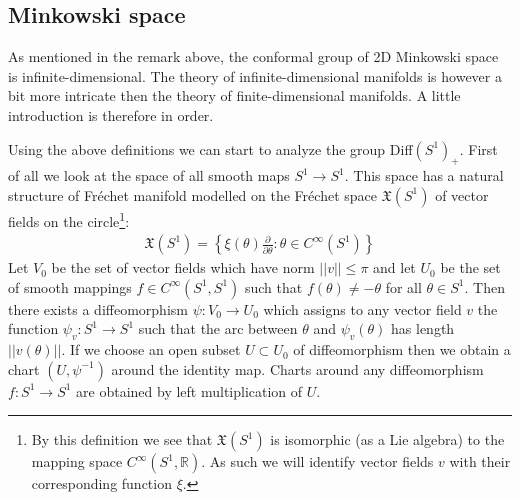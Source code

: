 \subsection{Minkowski space}

	As mentioned in the remark above, the conformal group of 2D Minkowski space is infinite-dimensional. The theory of infinite-dimensional manifolds is however a bit more intricate then the theory of finite-dimensional manifolds. A little introduction is therefore in order.

	
	Using the above definitions we can start to analyze the group Diff$(S^1)_+$. First of all we look at the space of all smooth maps $S^1\rightarrow S^1$. This space has a natural structure of Fr\'echet manifold modelled on the Fr\'echet space $\mathfrak{X}(S^1)$ of vector fields on the circle\footnote{By this definition we see that $\mathfrak{X}(S^1)$ is isomorphic (as a Lie algebra) to the mapping space $C^\infty(S^1, \mathbb{R})$. As such we will identify vector fields $v$ with their corresponding function $\xi$.}:
	\begin{gather}
		\mathfrak{X}(S^1) = \left\{\xi(\theta)\frac{\partial}{\partial\theta}:\theta\in C^\infty(S^1)\right\}
	\end{gather}
	Let $V_0$ be the set of vector fields which have norm $||v||\leq\pi$ and let $U_0$ be the set of smooth mappings $f\in C^\infty(S^1, S^1)$ such that $f(\theta)\neq-\theta$ for all $\theta\in S^1$. Then there exists a diffeomorphism $\psi:V_0\rightarrow U_0$ which assigns to any vector field $v$ the function $\psi_v:S^1\rightarrow S^1$ such that the arc between $\theta$ and $\psi_v(\theta)$ has length $||v(\theta)||$. If we choose an open subset $U\subset U_0$ of diffeomorphism then we obtain a chart $(U, \psi^{-1})$ around the identity map. Charts around any diffeomorphism $f:S^1\rightarrow S^1$ are obtained by left multiplication of $U$.
	

